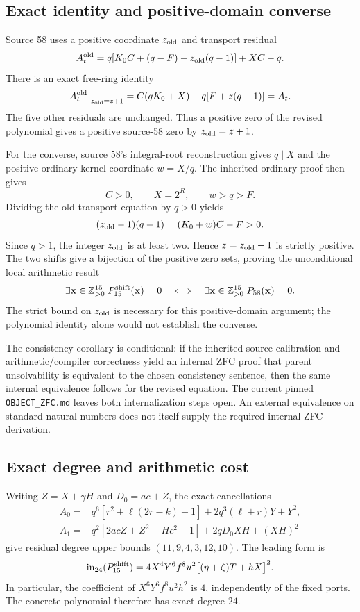\subsection{Exact identity and positive-domain converse}

Source 58 uses a positive coordinate $z_{\rm old}$ and transport residual
\[
 A_t^{\rm old}
   =q[K_0C+(q-F)-z_{\rm old}(q-1)]+XC-q.
\]
There is an exact free-ring identity
\[
 A_t^{\rm old}\big|_{z_{\rm old}=z+1}
   =C(qK_0+X)-q[F+z(q-1)]=A_t.
\]
The five other residuals are unchanged. Thus a positive zero of the revised
polynomial gives a positive source-58 zero by $z_{\rm old}=z+1$.

For the converse, source 58's integral-root reconstruction gives
$q\mid X$ and the positive ordinary-kernel coordinate $w=X/q$.
The inherited ordinary proof then gives
\[
 C>0,\qquad X=2^R,\qquad w>q>F.
\]
Dividing the old transport equation by $q>0$ yields
\[
 (z_{\rm old}-1)(q-1)=(K_0+w)C-F>0.
\]
Since $q>1$, the integer $z_{\rm old}$ is at least two. Hence
$z=z_{\rm old}-1$ is strictly positive. The two shifts give a bijection of
the positive zero sets, proving the unconditional local arithmetic result
\[
 \exists\mathbf x\in\mathbb Z_{>0}^{15}\;
                    P_{15}^{\rm shift}(\mathbf x)=0
 \quad\Longleftrightarrow\quad
 \exists\mathbf x\in\mathbb Z_{>0}^{15}\;P_{58}(\mathbf x)=0.
\]
The strict bound on $z_{\rm old}$ is necessary for this positive-domain
argument; the polynomial identity alone would not establish the converse.

The consistency corollary is conditional: if the inherited source
calibration and arithmetic/compiler correctness yield an internal ZFC
proof that parent unsolvability is equivalent to the chosen consistency
sentence, then the same internal equivalence follows for the revised
equation. The current pinned \texttt{OBJECT\_ZFC.md} leaves both
internalization steps open. An external equivalence on standard natural
numbers does not itself supply the required internal ZFC derivation.

\subsection{Exact degree and arithmetic cost}

Writing $Z=X+\gamma H$ and $D_0=ac+Z$, the exact cancellations
\begin{align*}
 A_0={}&q^6[r^2+\ell(2r-k)-1]+2q^3(\ell+r)Y+Y^2,\\
 A_1={}&q^2[2acZ+Z^2-Hc^2-1]+2qD_0XH+(XH)^2
\end{align*}
give residual degree upper bounds $(11,9,4,3,12,10)$. The leading form is
\[
 \operatorname{in}_{24}(P_{15}^{\rm shift})
   =4X^4Y^6f^8u^2\bigl[(\eta+\zeta)T+hX\bigr]^2.
\]
In particular, the coefficient of $X^6Y^6f^8u^2h^2$ is $4$, independently
of the fixed ports. The concrete polynomial therefore has exact degree $24$.

